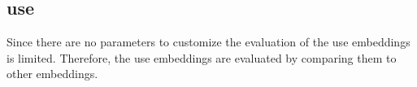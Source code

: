 \subsection*{\ac{use}}\label{subsec:evaluation-use}

Since there are no parameters to customize the evaluation of the \ac{use} embeddings is limited.
Therefore, the \ac{use} embeddings are evaluated by comparing them to other embeddings.